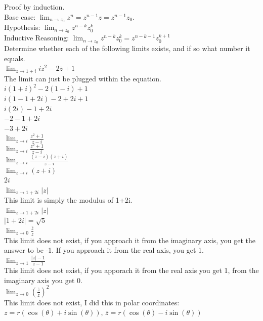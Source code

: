 \documentclass[12pt]{article}
\begin{document}
Proof by induction.\\

Base case: $\lim_{n\to z_0} z^n = z^{n-1}z = z^{n-1}z_0$.\\
Hypothesis: $\lim_{n \to z_0} z^{n-k}z^k_0$\\
Inductive Reasoning: $\lim_{n \to z_0} z^{n-k}z^k_0 = z^{n-k-1}z^{k+1}_0$\\


 Determine whether each of the following limits exists, and if so what number it equals.\\

 $\lim_{z \to 1+i} iz^2 - 2\bar{z} + 1$ \\
The limit can just be plugged within the equation.\\
$i(1+i)^2 - 2(1-i) + 1$\\
$i(1-1 + 2i) - 2 + 2i + 1$\\
$i(2i) - 1 + 2i$\\
$-2 - 1 + 2i$\\
$-3 + 2i$\\

 $\lim_{z \to i} \frac{z^2 + 1}{z-i}$ \\
$\lim_{z \to i} \frac{z^2+1}{z-i}$\\
$\lim_{z \to i} \frac{(z-i)(z+i)}{z-i}$\\
$\lim_{z \to i} (z+i)$\\
$2i$\\


 $\lim_{z \to 1+2i} |z|$ \\
This limit is simply the modulus of 1+2i.\\
$\lim_{z \to 1 + 2i} |z|$\\
$|1+2i| = \sqrt{5}$\\


 $\lim_{z \to 0} \frac{\bar{z}}{z}$ \\
This limit does not exist, if you approach it from the imaginary axis, you get the answer to be -1. 
If you approach it from the real axis, you get 1.\\

 $\lim_{z \to 1} \frac{|z|-1}{z-1}$ \\
This limit does not exist, if you apporach it from the real axis you get 1, from the imaginary axis you get 0.\\

 $\lim_{z \to 0} (\frac{\bar{z}}{z})^2$ \\
This limit does not exist, I did this in polar coordinates:\\
$z = r(\cos(\theta) + i\sin(\theta))$, $\bar{z} = r(\cos(\theta) - i\sin(\theta))$\\
\end{document}
